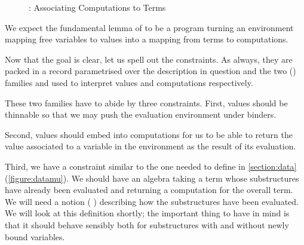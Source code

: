 \begin{figure}[h]
\caption{: Associating Computations to Terms}
\end{figure}

We expect the fundamental lemma of  to be a program
turning an environment mapping free variables to values into a
mapping from terms to computations.


Now that the goal is clear, let us spell out the  constraints.
As always, they are packed in a record parametrised over the description in
question and the two {()} families  and  used
to interpret values and computations respectively.

{
\label{defn:Semantics}
}

These two families have to abide by three constraints. First, values
should be thinnable so that we may push the evaluation environment
under binders.

\begin{agdasnippet}
\addtolength{\leftskip}{\parindent}
\end{agdasnippet}

Second, values should embed into computations for us to be able to
return the value associated to a variable in the environment as the
result of its evaluation.

\begin{agdasnippet}
\addtolength{\leftskip}{\parindent}
\end{agdasnippet}

Third, we have a constraint similar to the one needed to define  in
\cref{section:data} (\cref{figure:datamu}). We should have an algebra taking
a term whose substructures have already been evaluated and returning a
computation for the overall term.
%
We will need a notion {(  )} describing how
the substructures have been evaluated. We will look at this definition
shortly; the important thing to have in mind is that it should behave
sensibly both for substructures with and without newly bound variables.

\begin{agdasnippet}
\addtolength{\leftskip}{\parindent}
\end{agdasnippet}

